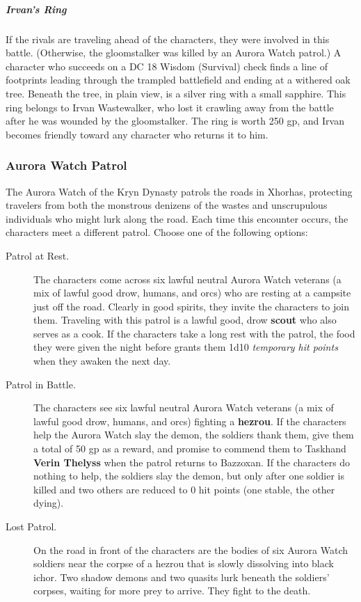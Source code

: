 \documentclass[10pt,a4paper,twoside,fancy,bg=print,twocolumn,openany,nodeprecatedcode]{dndbook}
\begin{document}
\subparagraph{Irvan's Ring}
If the rivals are traveling ahead of the characters, they were involved in this battle. (Otherwise, the gloomstalker was killed by an Aurora Watch patrol.) A character who succeeds on a DC 18 Wisdom (Survival) check finds a line of footprints leading through the trampled battlefield and ending at a withered oak tree. Beneath the tree, in plain view, is a silver ring with a small sapphire. This ring belongs to Irvan Wastewalker, who lost it crawling away from the battle after he was wounded by the gloomstalker. The ring is worth 250 gp, and Irvan becomes friendly toward any character who returns it to him.

\subsubsection{Aurora Watch Patrol}
The Aurora Watch of the Kryn Dynasty patrols the roads in Xhorhas, protecting travelers from both the monstrous denizens of the wastes and unscrupulous individuals who might lurk along the road. Each time this encounter occurs, the characters meet a different patrol. Choose one of the following options:


\begin{description}
\item[Patrol at Rest.]
The characters come across six lawful neutral Aurora Watch veterans (a mix of lawful good drow, humans, and orcs) who are resting at a campsite just off the road. Clearly in good spirits, they invite the characters to join them. Traveling with this patrol is a lawful good, drow \textbf{scout} who also serves as a cook. If the characters take a long rest with the patrol, the food they were given the night before grants them 1d10 \textit{temporary hit points} when they awaken the next day.
\item[Patrol in Battle.]
The characters see six lawful neutral Aurora Watch veterans (a mix of lawful good drow, humans, and orcs) fighting a \textbf{hezrou}. If the characters help the Aurora Watch slay the demon, the soldiers thank them, give them a total of 50 gp as a reward, and promise to commend them to Taskhand \textbf{Verin Thelyss} when the patrol returns to Bazzoxan. If the characters do nothing to help, the soldiers slay the demon, but only after one soldier is killed and two others are reduced to 0 hit points (one stable, the other dying).
\item[Lost Patrol.]
On the road in front of the characters are the bodies of six Aurora Watch soldiers near the corpse of a hezrou that is slowly dissolving into black ichor. Two shadow demons and two quasits lurk beneath the soldiers' corpses, waiting for more prey to arrive. They fight to the death.
\end{description}
\end{document}
